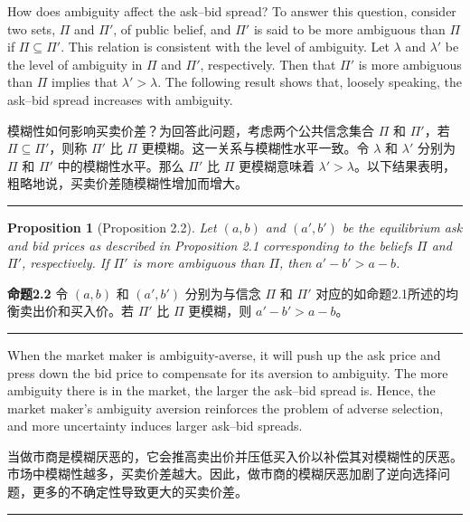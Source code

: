 \documentclass[12pt,a4paper]{article}
\newenvironment{original}{%
  \par\vspace{4pt}\noindent%
  \color{black}%
  \ignorespaces
}{%
  \par\vspace{2pt}%
}
\newenvironment{translation}{%
  \par\vspace{2pt}\noindent%
  \color{transblue}%
  \ignorespaces
}{%
  \par\vspace{4pt}\hrule\vspace{6pt}%
}
\newtheorem{proposition}[theorem]{Proposition}
\begin{document}
\begin{original}
How does ambiguity affect the ask--bid spread? To answer this question, consider two sets, $\Pi$ and $\Pi'$, of public belief, and $\Pi'$ is said to be more ambiguous than $\Pi$ if $\Pi \subseteq \Pi'$. This relation is consistent with the level of ambiguity. Let $\lambda$ and $\lambda'$ be the level of ambiguity in $\Pi$ and $\Pi'$, respectively. Then that $\Pi'$ is more ambiguous than $\Pi$ implies that $\lambda' > \lambda$. The following result shows that, loosely speaking, the ask--bid spread increases with ambiguity.
\end{original}
\begin{translation}
模糊性如何影响买卖价差？为回答此问题，考虑两个公共信念集合 $\Pi$ 和 $\Pi'$，若 $\Pi \subseteq \Pi'$，则称 $\Pi'$ 比 $\Pi$ 更模糊。这一关系与模糊性水平一致。令 $\lambda$ 和 $\lambda'$ 分别为 $\Pi$ 和 $\Pi'$ 中的模糊性水平。那么 $\Pi'$ 比 $\Pi$ 更模糊意味着 $\lambda' > \lambda$。以下结果表明，粗略地说，买卖价差随模糊性增加而增大。
\end{translation}

\begin{proposition}[Proposition 2.2]
Let $(a, b)$ and $(a', b')$ be the equilibrium ask and bid prices as described in Proposition 2.1 corresponding to the beliefs $\Pi$ and $\Pi'$, respectively. If $\Pi'$ is more ambiguous than $\Pi$, then $a' - b' > a - b$.
\end{proposition}
\begin{translation}
\textbf{命题2.2} 令 $(a, b)$ 和 $(a', b')$ 分别为与信念 $\Pi$ 和 $\Pi'$ 对应的如命题2.1所述的均衡卖出价和买入价。若 $\Pi'$ 比 $\Pi$ 更模糊，则 $a' - b' > a - b$。
\end{translation}

\begin{original}
When the market maker is ambiguity-averse, it will push up the ask price and press down the bid price to compensate for its aversion to ambiguity. The more ambiguity there is in the market, the larger the ask--bid spread is. Hence, the market maker's ambiguity aversion reinforces the problem of adverse selection, and more uncertainty induces larger ask--bid spreads.
\end{original}
\begin{translation}
当做市商是模糊厌恶的，它会推高卖出价并压低买入价以补偿其对模糊性的厌恶。市场中模糊性越多，买卖价差越大。因此，做市商的模糊厌恶加剧了逆向选择问题，更多的不确定性导致更大的买卖价差。
\end{translation}
\end{document}
